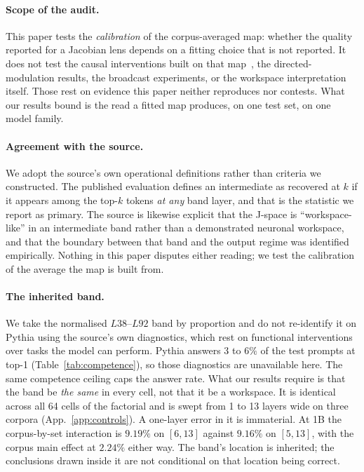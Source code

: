 \documentclass{article}
\begin{document}
\paragraph{Scope of the audit.} This paper tests the \emph{calibration} of the
corpus-averaged map: whether the quality reported for a Jacobian lens depends on a fitting
choice that is not reported. It does not test the causal interventions built on that
map~\citep{gurnee2026}, the directed-modulation results, the broadcast experiments, or the
workspace interpretation itself. Those rest on evidence this paper neither reproduces nor contests.
What our results bound is the read a fitted map produces, on one test set, on one model
family.

\paragraph{Agreement with the source.} We adopt the source's own operational definitions rather
than criteria we constructed. The published evaluation defines an intermediate as recovered at $k$
if it appears among the top-$k$ tokens \emph{at any} band layer, and that is the statistic we report
as primary. The source is likewise explicit that the J-space is ``workspace-like'' in an
intermediate band rather than a demonstrated neuronal workspace, and that the boundary between that
band and the output regime was identified empirically. Nothing in this paper disputes either
reading; we test the calibration of the average the map is built from.

\paragraph{The inherited band.} We take the normalised $L38$--$L92$
band by proportion and do not re-identify it on Pythia using the source's own diagnostics, which
rest on functional interventions over tasks the model can perform. Pythia answers 3 to $6\%$ of the
test prompts at top-1 (Table~\ref{tab:competence}), so those diagnostics are unavailable here. The same
competence ceiling caps the answer rate. What our
results require is that the band be \emph{the same} in every cell, not that it be a workspace. It is
identical across all 64 cells of the factorial and is swept from 1 to 13 layers wide on three
corpora (App.~\ref{app:controls}). A one-layer error in it is immaterial. At 1B the corpus-by-set
interaction is $9.19\%$ on $[6,13]$ against $9.16\%$ on $[5,13]$, with the corpus main effect at
$2.24\%$ either way. The band's location is inherited; the conclusions drawn inside it are
not conditional on that location being correct.
\end{document}
